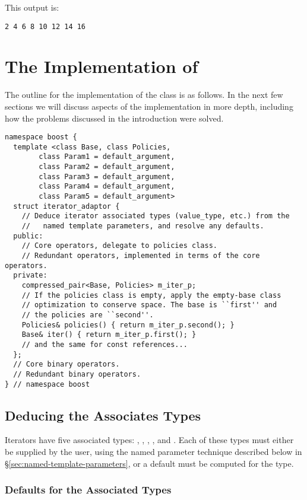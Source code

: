 \documentclass{netobjectdays}
\begin{document}
\noindent This output is: 
{\footnotesize
\begin{verbatim}
2 4 6 8 10 12 14 16
\end{verbatim}
}


\section{The Implementation of }

The outline for the implementation of the 
class is as follows. In the next few sections we will discuss aspects
of the implementation in more depth, including how the problems
discussed in the introduction were solved.

{\footnotesize
\begin{verbatim}
namespace boost {
  template <class Base, class Policies, 
	    class Param1 = default_argument,
	    class Param2 = default_argument,
	    class Param3 = default_argument,
	    class Param4 = default_argument,
	    class Param5 = default_argument>
  struct iterator_adaptor {
    // Deduce iterator associated types (value_type, etc.) from the
    //   named template parameters, and resolve any defaults.
  public:
    // Core operators, delegate to policies class.
    // Redundant operators, implemented in terms of the core operators.
  private:
    compressed_pair<Base, Policies> m_iter_p;
    // If the policies class is empty, apply the empty-base class
    // optimization to conserve space. The base is ``first'' and
    // the policies are ``second''.
    Policies& policies() { return m_iter_p.second(); }
    Base& iter() { return m_iter_p.first(); }
    // and the same for const references...
  };
  // Core binary operators.
  // Redundant binary operators.
} // namespace boost
\end{verbatim}
}

\subsection{Deducing the Associates Types}

Iterators have five associated types: ,
, , , and
. Each of these types must either be supplied
by the user, using the named parameter technique described below in
\S\ref{sec:named-template-parameters}, or a default must be computed
for the type.

\subsubsection{Defaults for the Associated Types}
\end{document}
